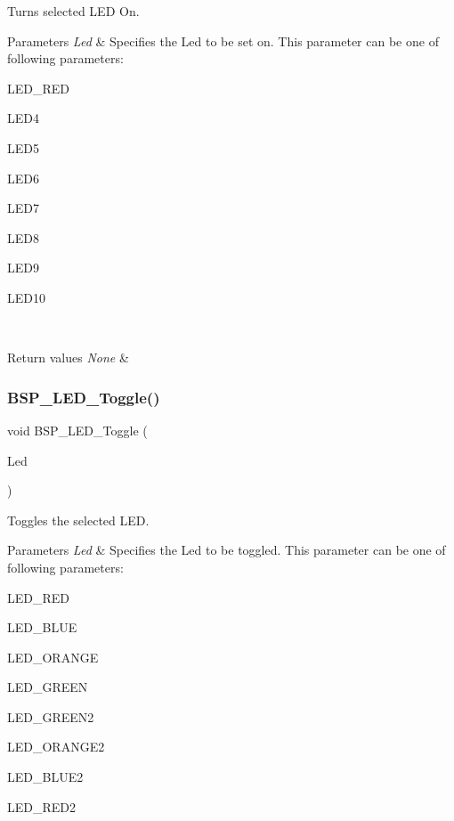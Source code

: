 Turns selected L\+ED On. 


\begin{DoxyParams}{Parameters}
{\em Led} & Specifies the Led to be set on. This parameter can be one of following parameters\+: \begin{DoxyItemize}
\item L\+E\+D\+\_\+\+R\+ED \item L\+E\+D4 \item L\+E\+D5 \item L\+E\+D6 \item L\+E\+D7 \item L\+E\+D8 \item L\+E\+D9 \item L\+E\+D10 \end{DoxyItemize}
\\
\hline
\end{DoxyParams}

\begin{DoxyRetVals}{Return values}
{\em None} & \\
\hline
\end{DoxyRetVals}
\mbox{\label{group__STM32F3__DISCOVERY__Exported__Functions_ga9fc84071d022ec6c51cdc00969a744e0}} 
\subsubsection{\texorpdfstring{B\+S\+P\+\_\+\+L\+E\+D\+\_\+\+Toggle()}{BSP\_LED\_Toggle()}}
{\footnotesize\ttfamily void B\+S\+P\+\_\+\+L\+E\+D\+\_\+\+Toggle (\begin{DoxyParamCaption}\item[{Led\+\_\+\+Type\+Def}]{Led }\end{DoxyParamCaption})}



Toggles the selected L\+ED. 


\begin{DoxyParams}{Parameters}
{\em Led} & Specifies the Led to be toggled. This parameter can be one of following parameters\+: \begin{DoxyItemize}
\item L\+E\+D\+\_\+\+R\+ED \item L\+E\+D\+\_\+\+B\+L\+UE \item L\+E\+D\+\_\+\+O\+R\+A\+N\+GE \item L\+E\+D\+\_\+\+G\+R\+E\+EN \item L\+E\+D\+\_\+\+G\+R\+E\+E\+N2 \item L\+E\+D\+\_\+\+O\+R\+A\+N\+G\+E2 \item L\+E\+D\+\_\+\+B\+L\+U\+E2 \item L\+E\+D\+\_\+\+R\+E\+D2 \end{DoxyItemize}
\\
\hline
\end{DoxyParams}

